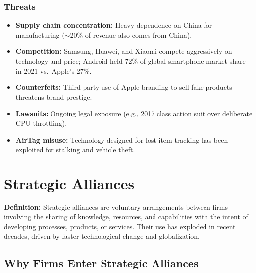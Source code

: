 \documentclass[11pt, letterpaper]{article}
\begin{document}
\subsubsection{Threats}
\begin{itemize}[leftmargin=*]
  \item \textbf{Supply chain concentration:} Heavy dependence on China for manufacturing ($\sim$20\% of revenue also comes from China).
  \item \textbf{Competition:} Samsung, Huawei, and Xiaomi compete aggressively on technology and price; Android held 72\% of global smartphone market share in 2021 vs.\ Apple's 27\%.
  \item \textbf{Counterfeits:} Third-party use of Apple branding to sell fake products threatens brand prestige.
  \item \textbf{Lawsuits:} Ongoing legal exposure (e.g., 2017 class action suit over deliberate CPU throttling).
  \item \textbf{AirTag misuse:} Technology designed for lost-item tracking has been exploited for stalking and vehicle theft.
\end{itemize}

\newpage

\section{Strategic Alliances}

\begin{defbox}
\textbf{Definition:} Strategic alliances are voluntary arrangements between firms involving the sharing of knowledge, resources, and capabilities with the intent of developing processes, products, or services. Their use has exploded in recent decades, driven by faster technological change and globalization.
\end{defbox}

\subsection{Why Firms Enter Strategic Alliances}
\end{document}
